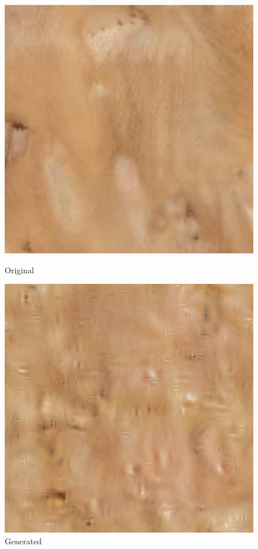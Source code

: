 \documentclass{article}
\begin{document}
    \begin{figure}[!htb]
    \begin{center}
      \includegraphics[scale=.34]{5/report/steerable/7.png}
      \caption{Original}
    \end{center}
    \endminipage \hfill
    \begin{center}
      \includegraphics[scale=.34]{5/report/steerable/7_c.png}
      \caption{Generated}
    \end{center}
    \endminipage
    \end{figure} 
\pagebreak\\
\end{document}
